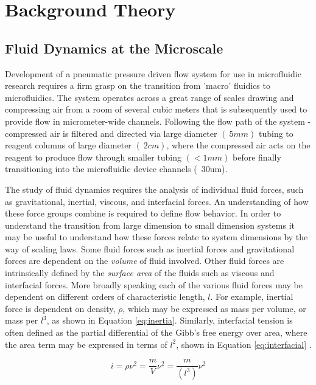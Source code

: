 \chapter{Background Theory}

\section{Fluid Dynamics at the Microscale}
Development of a pneumatic pressure driven flow system for use in microfluidic research requires a firm grasp on the transition from 'macro' fluidics to microfluidics. The system operates across a great range of scales drawing and compressing air from a room of several cubic meters that is subsequently used to provide flow in micrometer-wide channels. Following the flow path of the system - compressed air is filtered and directed via large diameter $(~5mm)$ tubing to reagent columns of large diameter $(~2cm)$, where the compressed air acts on the reagent to produce flow through smaller tubing $(<1mm)$ before finally transitioning into the microfluidic device channels (~30um). 

The study of fluid dynamics requires the analysis of individual fluid forces, such as gravitational, inertial, viscous, and interfacial forces. An understanding of how these force groups combine is required to define flow behavior. In order to understand the transition from large dimension to small dimension systems it may be useful to understand how these forces relate to system dimensions by the way of scaling laws. Some fluid forces such as inertial forces and gravitational forces are dependent on the \emph{volume} of fluid involved. Other fluid forces are intrinsically defined by the \emph{surface area} of the fluids such as viscous and interfacial forces. More broadly speaking each of the various fluid forces may be dependent on different orders of characteristic length, $l$. For example, inertial force is dependent on density, $\rho$, which may be expressed as mass per volume, or mass per $l^3$, as shown in Equation \vref{eq:inertia}. Similarly, interfacial tension is often defined as the partial differential of the Gibb's free energy over area, where the area term may be expressed in terms of $l^2$, shown in Equation \vref{eq:interfacial} \cite{Baroud2010}.


\begin{equation}
i = \rho \nu^2 = \frac{m}{V}\nu^2 = \frac{m}{(l^3)}\nu^2 
\label{eq:inertia}
\end{equation}

